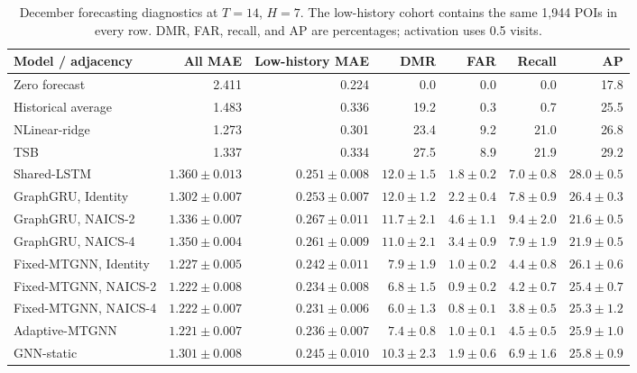 \begin{table}[!htbp]
\centering
\begingroup
\singlespacing
\fontsize{9pt}{10.5pt}\selectfont
\setlength{\tabcolsep}{4pt}
\renewcommand{\arraystretch}{1.08}
\caption{December forecasting diagnostics at $T=14$, $H=7$. The low-history cohort contains the same 1,944 POIs in every row. DMR, FAR, recall, and AP are percentages; activation uses 0.5 visits.}
\label{tab:zero_collapse_diagnostic}
\begin{adjustbox}{max width=\linewidth}
\begin{tabular}{lrrrrrr}
\toprule
Model / adjacency & All MAE & Low-history MAE & DMR & FAR & Recall & AP \\
\midrule
Zero forecast & 2.411 & 0.224 & 0.0 & 0.0 & 0.0 & 17.8 \\
Historical average & 1.483 & 0.336 & 19.2 & 0.3 & 0.7 & 25.5 \\
NLinear-ridge & 1.273 & 0.301 & 23.4 & 9.2 & 21.0 & 26.8 \\
TSB & 1.337 & 0.334 & 27.5 & 8.9 & 21.9 & 29.2 \\
Shared-LSTM & $1.360\pm 0.013$ & $0.251\pm 0.008$ & $12.0\pm 1.5$ & $1.8\pm 0.2$ & $7.0\pm 0.8$ & $28.0\pm 0.5$ \\
GraphGRU, Identity & $1.302\pm 0.007$ & $0.253\pm 0.007$ & $12.0\pm 1.2$ & $2.2\pm 0.4$ & $7.8\pm 0.9$ & $26.4\pm 0.3$ \\
GraphGRU, NAICS-2 & $1.336\pm 0.007$ & $0.267\pm 0.011$ & $11.7\pm 2.1$ & $4.6\pm 1.1$ & $9.4\pm 2.0$ & $21.6\pm 0.5$ \\
GraphGRU, NAICS-4 & $1.350\pm 0.004$ & $0.261\pm 0.009$ & $11.0\pm 2.1$ & $3.4\pm 0.9$ & $7.9\pm 1.9$ & $21.9\pm 0.5$ \\
Fixed-MTGNN, Identity & $1.227\pm 0.005$ & $0.242\pm 0.011$ & $7.9\pm 1.9$ & $1.0\pm 0.2$ & $4.4\pm 0.8$ & $26.1\pm 0.6$ \\
Fixed-MTGNN, NAICS-2 & $1.222\pm 0.008$ & $0.234\pm 0.008$ & $6.8\pm 1.5$ & $0.9\pm 0.2$ & $4.2\pm 0.7$ & $25.4\pm 0.7$ \\
Fixed-MTGNN, NAICS-4 & $1.222\pm 0.007$ & $0.231\pm 0.006$ & $6.0\pm 1.3$ & $0.8\pm 0.1$ & $3.8\pm 0.5$ & $25.3\pm 1.2$ \\
Adaptive-MTGNN & $1.221\pm 0.007$ & $0.236\pm 0.007$ & $7.4\pm 0.8$ & $1.0\pm 0.1$ & $4.5\pm 0.5$ & $25.9\pm 1.0$ \\
GNN-static & $1.301\pm 0.008$ & $0.245\pm 0.010$ & $10.3\pm 2.3$ & $1.9\pm 0.6$ & $6.9\pm 1.6$ & $25.8\pm 0.9$ \\
\bottomrule
\end{tabular}
\end{adjustbox}
\endgroup
\end{table}
